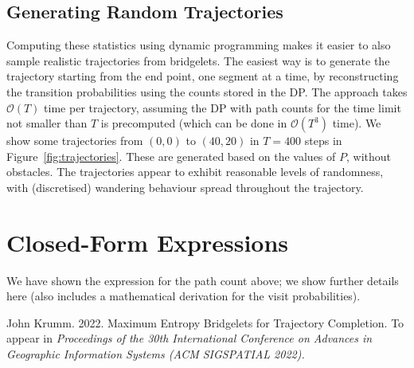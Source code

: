 \documentclass[11pt,a4paper,twoside,british]{article}
\begin{document}
\subsection{Generating Random Trajectories}\label{subsec:sampling}
Computing these statistics using dynamic programming makes it easier to also
sample realistic trajectories from bridgelets.
The easiest way is to generate the trajectory starting from the end point, one
segment at a time, by reconstructing the transition probabilities using the
counts stored in the DP.
The approach takes $\mathcal{O}(T)$ time per trajectory, assuming the DP with
path counts for the time limit not smaller than $T$ is precomputed (which can be
done in $\mathcal{O}(T^3)$ time).
We show some trajectories from $(0, 0)$ to $(40, 20)$ in $T = 400$ steps in
Figure~\ref{fig:trajectories}.
These are generated based on the values of $P$, without obstacles.
The trajectories appear to exhibit reasonable levels of randomness, with
(discretised) wandering behaviour spread throughout the trajectory.

\section{Closed-Form Expressions}
We have shown the expression for the path count above; we show further details
here (also includes a mathematical derivation for the visit probabilities).

\begin{thebibliography}{9}
John Krumm.
2022.
Maximum Entropy Bridgelets for Trajectory Completion.
To appear in \textit{Proceedings of the 30th International Conference on
Advances in Geographic Information Systems (ACM SIGSPATIAL 2022).}
\end{thebibliography}
\end{document}
